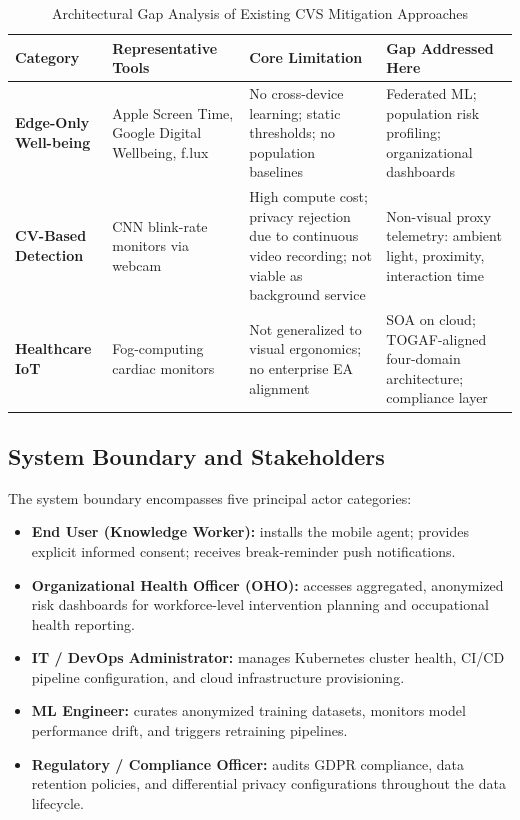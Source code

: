 \documentclass[conference]{IEEEtran}
\begin{document}
\begin{table}[H]
  \centering
  \caption{Architectural Gap Analysis of Existing CVS Mitigation Approaches}
  \label{tab:gap}
  \begin{tabularx}{\textwidth}{>{\bfseries}p{3cm} p{4.5cm} p{4.5cm} p{3.2cm}}
    \toprule
    \textbf{Category} & \textbf{Representative Tools} &
    \textbf{Core Limitation} & \textbf{Gap Addressed Here} \\
    \midrule
    Edge-Only Well-being & Apple Screen Time, Google Digital Wellbeing, f.lux &
      No cross-device learning; static thresholds; no population baselines \cite{b1} &
      Federated ML; population risk profiling; organizational dashboards \\
    \addlinespace
    CV-Based Detection & CNN blink-rate monitors via webcam &
      High compute cost; privacy rejection due to continuous video recording;
      not viable as background service \cite{b4} &
      Non-visual proxy telemetry: ambient light, proximity, interaction time \\
    \addlinespace
    Healthcare IoT & Fog-computing cardiac monitors \cite{b5} &
      Not generalized to visual ergonomics; no enterprise EA alignment &
      SOA on cloud; TOGAF-aligned four-domain architecture; compliance layer \\
    \bottomrule
  \end{tabularx}
\end{table}

\subsection{System Boundary and Stakeholders}

The system boundary encompasses five principal actor categories:

\begin{itemize}
  \item \textbf{End User (Knowledge Worker):} installs the mobile agent; provides
        explicit informed consent; receives break-reminder push notifications.
  \item \textbf{Organizational Health Officer (OHO):} accesses aggregated, anonymized
        risk dashboards for workforce-level intervention planning and occupational
        health reporting.
  \item \textbf{IT / DevOps Administrator:} manages Kubernetes cluster health,
        CI/CD pipeline configuration, and cloud infrastructure provisioning.
  \item \textbf{ML Engineer:} curates anonymized training datasets, monitors model
        performance drift, and triggers retraining pipelines.
  \item \textbf{Regulatory / Compliance Officer:} audits GDPR compliance, data
        retention policies, and differential privacy configurations throughout
        the data lifecycle.
\end{itemize}
\end{document}
